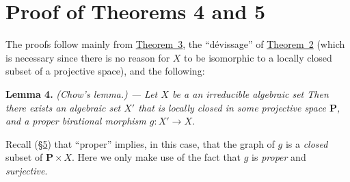 \documentclass{article}
\newenvironment{itenv}[1]
  {\smallskip\noindent\textbf{#1.}\itshape}
  {\smallskip}
\newcommand{\oldpage}[1]{\marginpar{\footnotesize$\Big\vert$ \textit{p.~#1}}}
\begin{document}
\section{Proof of Theorems 4 and 5}
\label{section7}

The proofs follow mainly from \hyperref[theorem3]{Theorem~3}, the ``d\'{e}vissage'' of \hyperref[theorem2]{Theorem~2} (which is necessary since there is no reason for $X$ to be isomorphic to a locally closed subset of a projective space), and the following:

\begin{itenv}{Lemma 4}
\label{lemma4}
\emph{(Chow's lemma.) ---}
  Let $X$ be a an irreducible algebraic set
  Then there exists an algebraic set $X'$ that is locally closed in some projective space $\mathbf{P}$, and a proper birational morphism $g\colon X'\to X$.
\end{itenv}

Recall (\hyperref[section5]{\S5}) that ``proper'' implies, in this case, that the graph of $g$
\oldpage{2-11}
is a \emph{closed} subset of $\mathbf{P}\times X$.
Here we only make use of the fact that $g$ is \emph{proper} and \emph{surjective}.
\end{document}

